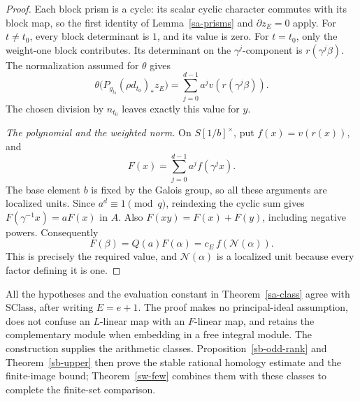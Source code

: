 \begin{proof}
Each block prism is a cycle: its scalar cyclic
character commutes with its block map, so the first
identity of Lemma~\ref{sa-prisms} and
\(\partial z_E=0\) apply.
For \(t\ne t_0\), every block determinant is \(1\),
and its value is zero.
For \(t=t_0\), only the weight-one block contributes.
Its determinant on the \(\gamma^j\)-component is
\(r(\gamma^j\beta)\).
The normalization assumed for \(\theta\) gives
\[
       \theta\bigl(P_{g_{t_0}}(\rho d_{t_0})_*z_E\bigr)
               =\sum_{j=0}^{d-1}a^j v(r(\gamma^j\beta)).
\]
The chosen division by \(n_{t_0}\) leaves exactly
this value for \(y\).

\emph{The polynomial and the weighted norm.}
On \(S[1/b]^\times\), put \(f(x)=v(r(x))\), and
\[
                         F(x)=\sum_{j=0}^{d-1}a^j f(\gamma^jx).
\]
The base element \(b\) is fixed by the Galois group,
so all these arguments are localized units.
Since \(a^d\equiv1\pmod q\), reindexing the cyclic
sum gives
\(F(\gamma^{-1}x)=aF(x)\) in \(A\).
Also \(F(xy)=F(x)+F(y)\), including negative powers.
Consequently
\[
     F(\beta)=Q(a)F(\alpha)
            =c_E\,f(\mathcal N(\alpha)).
\]
This is precisely the required value, and
\(\mathcal N(\alpha)\) is a localized unit because
every factor defining it is one.
\end{proof}

All the hypotheses and the evaluation constant in
Theorem~\ref{sa-class} agree with \(\mathrm{SClass}\),
after writing \(E=e+1\).
The proof makes no principal-ideal assumption,
does not confuse an \(L\)-linear map with an
\(F\)-linear map, and retains the complementary
module when embedding in a free integral module.
The construction supplies the arithmetic classes.
Proposition~\ref{sb-odd-rank} and Theorem~\ref{sb-upper}
then prove the stable rational homology estimate and the
finite-image bound; Theorem~\ref{sw-few} combines them
with these classes to complete the finite-set comparison.


